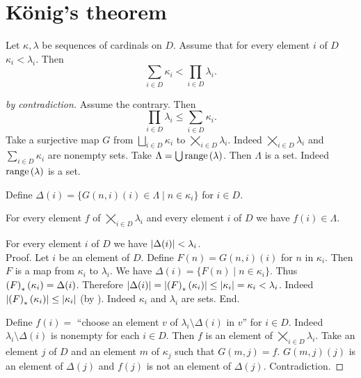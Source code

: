 \documentclass{article}
\newcommand{\SumSet}[2]{\bigsqcup_{i \in #2} #1_{i}}
\newcommand{\Sum}[2]{\sum_{i \in #2} #1_{i}}
\newcommand{\ProdSet}[2]{\bigtimes_{i \in #2} #1_{i}}
\newcommand{\Prod}[2]{\prod_{i \in #2} #1_{i}}
\begin{document}
\section*{König's theorem}

\begin{forthel}
  \begin{theorem*}[König]\label{koenig}
    Let $\kappa, \lambda$ be sequences of cardinals on $D$.
    Assume that for every element $i$ of $D$ $\kappa_{i} \less \lambda_{i}$.
    Then \[ \Sum{\kappa}{D} \less \Prod{\lambda}{D}. \]
  \end{theorem*}
  \begin{proof}[by contradiction]
    Assume the contrary.
    Then \[ \Prod{\lambda}{D} \leq \Sum{\kappa}{D}. \]
    Take a surjective map $G$ from $\SumSet{\kappa}{D}$ to
    $\ProdSet{\lambda}{D}$.
    Indeed $\ProdSet{\lambda}{D}$ and $\Sum{\kappa}{D}$ are nonempty sets.
    Take $\Lambda = \bigcup \mathrm{range}\left(\lambda\right)$.
    Then $\Lambda$ is a set.
    Indeed $\mathrm{range}\left(\lambda\right)$ is a set.

    Define $\Delta(i) = \{ G(n,i)(i) \in \Lambda \mid n \in \kappa_{i} \}$ for
    $i \in D$.

    For every element $f$ of $\ProdSet{\lambda}{D}$ and every element $i$ of $D$
    we have $f(i) \in \Lambda$.

    For every element $i$ of $D$ we have $\left\vert\Delta(i)\right\vert < \lambda_{i}$. \\
    Proof.
      Let $i$ be an element of $D$.
      Define $F(n) = G(n,i)(i)$ for $n$ in $\kappa_{i}$.
      Then $F$ is a map from $\kappa_{i}$ to $\lambda_{i}$.
      We have $\Delta(i) = \{ F(n) \mid n \in \kappa_{i} \}$.
      Thus $\left(F\right)_{*}(\kappa_{i}) = \Delta(i)$.
      Therefore $\left\vert\Delta(i)\right\vert
        = \left\vert\left(F\right)_{*}(\kappa_{i})\right\vert
        \leq \left\vert\kappa_{i}\right\vert
        = \kappa_{i}
        < \lambda_{i}$.
      Indeed $\left\vert\left(F\right)_{*}(\kappa_{i})\right\vert \leq \left\vert\kappa_{i}\right\vert$
      (by ).
      Indeed $\kappa_{i}$ and $\lambda_{i}$ are sets.
    End.

    Define $f(i) =$ ``choose an element $v$ of $\lambda_{i} \setminus
    \Delta(i)$ in $v$'' for $i \in D$.
    Indeed $\lambda_{i} \setminus \Delta(i)$ is nonempty for each $i \in D$.
    Then $f$ is an element of $\ProdSet{\lambda}{D}$.
    Take an element $j$ of $D$ and an element $m$ of $\kappa_{j}$ such that
    $G(m,j) = f$.
    $G(m,j)(j)$ is an element of $\Delta(j)$ and
    $f(j)$ is not an element of $\Delta(j)$.
    Contradiction.
  \end{proof}
\end{forthel}

\printbibliography
\end{document}
